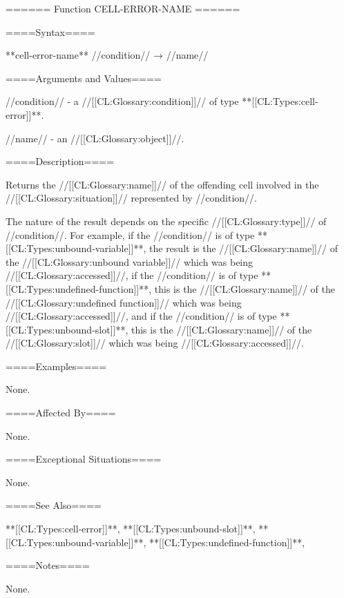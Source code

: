 ====== Function CELL-ERROR-NAME ======

====Syntax====

**cell-error-name** //condition// → //name//

====Arguments and Values====

//condition// - a //[[CL:Glossary:condition]]// of type **[[CL:Types:cell-error]]**.

//name// - an //[[CL:Glossary:object]]//.

====Description====

Returns the //[[CL:Glossary:name]]// of the offending cell involved in the //[[CL:Glossary:situation]]// represented by //condition//.

The nature of the result depends on the specific //[[CL:Glossary:type]]// of //condition//. For example, if the //condition// is of type **[[CL:Types:unbound-variable]]**, the result is the //[[CL:Glossary:name]]// of the //[[CL:Glossary:unbound variable]]// which was being //[[CL:Glossary:accessed]]//, if the //condition// is of type **[[CL:Types:undefined-function]]**, this is the //[[CL:Glossary:name]]// of the //[[CL:Glossary:undefined function]]// which was being //[[CL:Glossary:accessed]]//, and if the //condition// is of type **[[CL:Types:unbound-slot]]**, this is the //[[CL:Glossary:name]]// of the //[[CL:Glossary:slot]]// which was being //[[CL:Glossary:accessed]]//.

====Examples====

None.

====Affected By====

None.

====Exceptional Situations====

None.

====See Also====

**[[CL:Types:cell-error]]**, **[[CL:Types:unbound-slot]]**, **[[CL:Types:unbound-variable]]**, **[[CL:Types:undefined-function]]**,{\secref\ConditionSystemConcepts}

====Notes====

None.


